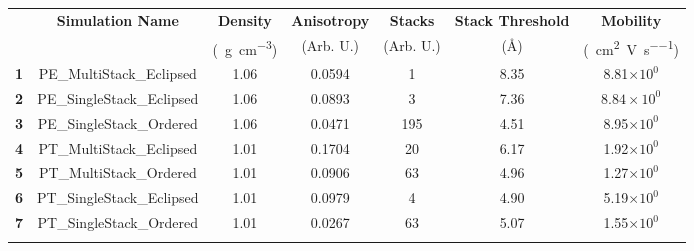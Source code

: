 \documentclass[12pt]{article}
\def\mobunits{\square\centi\meter\per\volt\per\second}
\def\gcm{\gram\per\cubic\centi\meter}
\def\ccg{\cellcolor{gray}}
\begin{document}
\begin{center}
\begin{adjustbox}{max width = \textwidth}
\begin{tabular}{| c | c | c | c | c | c | c |}
\hline
\rule{0pt}{2.5ex} 
\multirow{2}{*}{\textbf{ID}}&\multirow{2}{*}{\textbf{Simulation Name}}&\textbf{Density}&\textbf{Anisotropy}&\textbf{Stacks}&\textbf{Stack Threshold}&\textbf{Mobility}\\
                            &&(\SI{}{\gcm})&(Arb. U.)&(Arb. U.)&(\AA)&(\SI{}{\mobunits})\\
\hhline{|=======|}
\textbf{\ccg1}&\rule{0pt}{2.5ex}\ccg PE\_MultiStack\_Eclipsed&\ccg 1.06&\ccg 0.0594&\ccg 1&\ccg8.35&\ccg8.81$\times 10^{0}$\\
\textbf{2}&\rule{0pt}{2.5ex}PE\_SingleStack\_Eclipsed&1.06&0.0893&3&7.36&$8.84\times 10^{0}$\\
\textbf{\ccg3}&\rule{0pt}{2.5ex}\ccg PE\_SingleStack\_Ordered&\ccg 1.06&\ccg 0.0471&\ccg195&\ccg4.51&\ccg8.95$\times 10^{0}$\\
\hhline{|=======|}
\textbf{4}&\rule{0pt}{2.5ex}PT\_MultiStack\_Eclipsed&1.01&0.1704&20&6.17&1.92$\times 10^{0}$\\
\textbf{\ccg5}&\rule{0pt}{2.5ex}\ccg PT\_MultiStack\_Ordered&\ccg 1.01&\ccg 0.0906&\ccg63&\ccg4.96&\ccg1.27$\times 10^{0}$\\
\textbf{6}&\rule{0pt}{2.5ex}PT\_SingleStack\_Eclipsed&1.01&0.0979&4&4.90&5.19$\times 10^{0}$\\
\textbf{\ccg7}&\rule{0pt}{2.5ex}\ccg PT\_SingleStack\_Ordered&\ccg 1.01&\ccg 0.0267&\ccg63&\ccg5.07&\ccg1.55$\times 10^{0}$\\
\hhline{-------}
\end{tabular}\label{table:mob}
\end{adjustbox}
\end{center}

\clearpage
\end{document}
